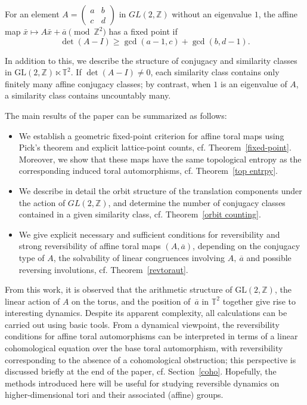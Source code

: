 \documentclass[12pt]{amsart}
\theoremstyle{plain}
\theoremstyle{definition}
\theoremstyle{remark}
\newcommand{\Z}{\mathbb Z}
\begin{document}
For an element $A= \begin{pmatrix}
a & b\\ c& d    
\end{pmatrix}$ in $GL(2, \mathbb Z)$ without an eigenvalue $1$, the affine map $\bar{x} \mapsto A\bar{x} + \overline{a}\pmod{\mathbb{Z}^2}$
has a fixed point if 
$$\det(A-I) \ge \gcd(a-1,c) + \gcd(b,d-1).$$


In addition to this, we describe the structure of conjugacy and similarity classes in
$\mathrm{GL}(2,\mathbb{Z}) \ltimes \mathbb{T}^{2}$. If $\det(A-I) \neq 0$, each similarity class contains 
only finitely many affine conjugacy classes; by contrast, when $1$ is an eigenvalue 
of $A$, a similarity class contains uncountably many.


\medskip The main  results of the paper can be summarized as follows:
\begin{itemize}

\medskip \item We establish a  geometric fixed-point criterion for affine toral maps using Pick’s theorem and explicit lattice-point counts, cf. Theorem~\ref{fixed-point}. Moreover, we show that these maps have the same topological entropy as the corresponding induced toral automorphisms, cf. Theorem~\ref{top entrpy}.

  \medskip \item We describe in detail the orbit structure of the translation components under the action of $GL(2,\Z)$, and determine the number of conjugacy classes contained in a given similarity class, cf.  Theorem~\ref{orbit counting}.

\medskip \item We give explicit necessary and sufficient conditions for reversibility and
      strong reversibility of affine toral maps $ (A,\overline{a})$, depending on the
      conjugacy type of $ A$, the solvability of linear congruences involving
      $ A,~ \overline{a}$ and possible reversing involutions, cf. Theorem~\ref{revtoraut}. 

    \end{itemize}

From this work, it is observed that the arithmetic structure of $\mathrm{GL}(2,\mathbb{Z})$, 
the linear action of $A$ on the torus, and the position of~$\overline{a}$ in $\mathbb{T}^2$ 
together give rise to interesting dynamics. Despite its apparent complexity, all 
calculations can be carried out using basic tools. From a dynamical viewpoint, the reversibility conditions for affine toral automorphisms
can be interpreted in terms of a linear cohomological equation over the base toral
automorphism, with reversibility corresponding to the absence of a cohomological
obstruction; this perspective is discussed briefly at the end of the paper, cf. Section~\ref{coho}. 
Hopefully, the methods introduced 
here will be useful for studying reversible dynamics on higher-dimensional tori and their 
associated (affine) groups.
\end{document}
